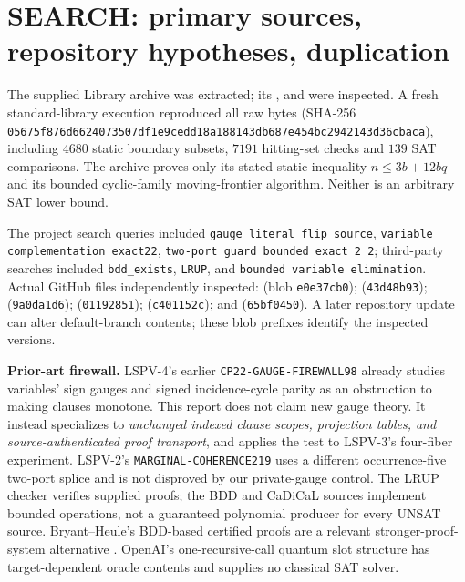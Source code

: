 \documentclass[11pt]{article}
\begin{document}
\section{SEARCH: primary sources, repository hypotheses, duplication}
The supplied Library archive  was extracted; its ,  and  were inspected. A fresh standard-library execution reproduced all raw bytes (SHA-256 \texttt{05675f876d6624073507df1e9cedd18a188143db687e454bc2942143d36cbaca}), including $4680$ static boundary subsets, $7191$ hitting-set checks and $139$ SAT comparisons. The archive proves only its stated static inequality $n\le3b+12bq$ and its bounded cyclic-family moving-frontier algorithm. Neither is an arbitrary SAT lower bound.

The project search queries included \texttt{gauge literal flip source}, \texttt{variable complementation exact22}, \texttt{two-port guard bounded exact 2 2}; third-party searches included \texttt{bdd\_exists}, \texttt{LRUP}, and \texttt{bounded variable elimination}. Actual GitHub files independently inspected:  (blob \texttt{e0e37cb0});  (\texttt{43d48b93});  (\texttt{9a0da1d6});  (\texttt{01192851});  (\texttt{c401152c}); and  (\texttt{65bf0450}). A later repository update can alter default-branch contents; these blob prefixes identify the inspected versions.

\noindent\textbf{Prior-art firewall.} LSPV-4's earlier \texttt{CP22-GAUGE-FIREWALL98} already studies variables' sign gauges and signed incidence-cycle parity as an obstruction to making clauses monotone. This report does not claim new gauge theory. It instead specializes to \emph{unchanged indexed clause scopes, projection tables, and source-authenticated proof transport}, and applies the test to LSPV-3's four-fiber experiment. LSPV-2's \texttt{MARGINAL-COHERENCE219} uses a different occurrence-five two-port splice and is not disproved by our private-gauge control. The LRUP checker verifies supplied proofs; the BDD and CaDiCaL sources implement bounded operations, not a guaranteed polynomial producer for every UNSAT source. Bryant--Heule's BDD-based certified proofs are a relevant stronger-proof-system alternative \cite{bryant}. OpenAI's one-recursive-call quantum slot structure has target-dependent oracle contents and supplies no classical SAT solver.
\end{document}
